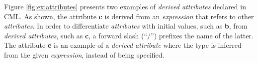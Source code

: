 Figure \ref{fig:ex:attributes} presents two examples of \emph{derived attributes}
declared in CML.
As shown,
the attribute \textbf{c} is derived from an \emph{expression}
that refers to other \emph{attributes}.
In order to differentiate \emph{attributes} with initial values,
such as \textbf{b},
from \emph{derived attributes},
such as \textbf{c},
a forward slash (``/'') prefixes the name of the latter.
The attribute \textbf{e} is an example of a \emph{derived attribute}
where the type is inferred from the given \emph{expression},
instead of being specified.
